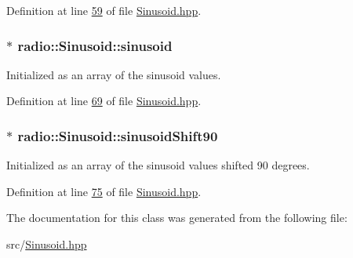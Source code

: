 Definition at line \hyperlink{Sinusoid_8hpp_source_l00059}{59} of file \hyperlink{Sinusoid_8hpp_source}{Sinusoid.\+hpp}.

\hypertarget{classradio_1_1Sinusoid_a56556c3d3e08d1c9481c18e087ff1c85}{
\subsubsection[{sinusoid}]{$\ast$ radio\+::\+Sinusoid\+::sinusoid\hspace{0.3cm}{\ttfamily [protected]}}}\label{classradio_1_1Sinusoid_a56556c3d3e08d1c9481c18e087ff1c85}
Initialized as an array of the sinusoid values. 

Definition at line \hyperlink{Sinusoid_8hpp_source_l00069}{69} of file \hyperlink{Sinusoid_8hpp_source}{Sinusoid.\+hpp}.

\hypertarget{classradio_1_1Sinusoid_a556db1dca1d5af3d9c6ba2d51f9e3cf8}{
\subsubsection[{sinusoid\+Shift90}]{$\ast$ radio\+::\+Sinusoid\+::sinusoid\+Shift90\hspace{0.3cm}{\ttfamily [protected]}}}\label{classradio_1_1Sinusoid_a556db1dca1d5af3d9c6ba2d51f9e3cf8}
Initialized as an array of the sinusoid values shifted 90 degrees. 

Definition at line \hyperlink{Sinusoid_8hpp_source_l00075}{75} of file \hyperlink{Sinusoid_8hpp_source}{Sinusoid.\+hpp}.



The documentation for this class was generated from the following file\+:\begin{DoxyCompactItemize}
\item 
src/\hyperlink{Sinusoid_8hpp}{Sinusoid.\+hpp}\end{DoxyCompactItemize}
